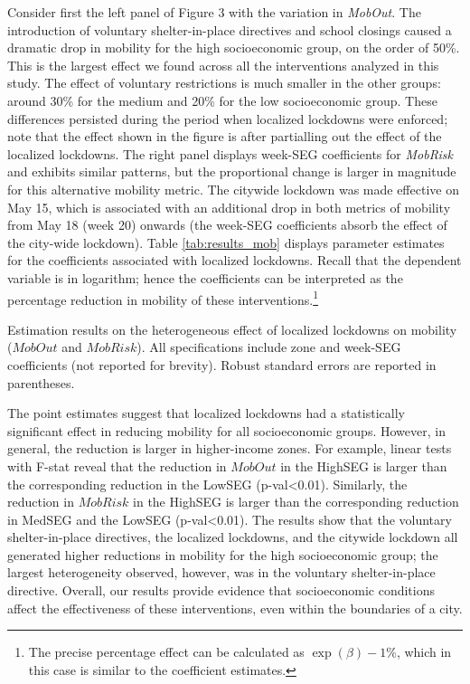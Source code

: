 Consider first the left panel of Figure 3 with the variation in \emph{MobOut}. The introduction of voluntary shelter-in-place directives and school closings caused a dramatic drop in mobility for the high socioeconomic group, on the order of 50\%. This is the largest effect we found across all the interventions analyzed in this study. The effect of voluntary restrictions is much smaller in the other groups: around 30\% for the medium and 20\% for the low socioeconomic group. These differences persisted during the period when localized lockdowns were enforced; note that the effect shown in the figure is after partialling out the effect of the localized lockdowns. The right panel displays week-SEG coefficients for \emph{MobRisk} and exhibits similar patterns, but the proportional change is larger in magnitude for this alternative mobility metric. The citywide lockdown was made effective on May 15, which is associated with an additional drop in both metrics of mobility from May 18 (week 20) onwards (the week-SEG coefficients  absorb the effect of the city-wide lockdown). 
Table \ref{tab:results_mob} displays parameter estimates for the coefficients associated with localized lockdowns. Recall that the dependent variable is in logarithm; hence the coefficients can be interpreted as the percentage reduction in mobility of these interventions.\footnote{The precise percentage effect can be calculated as  $\exp(\beta) - 1\%$, which in this case is similar to the coefficient estimates.}

\begin{table}[htbp] \centering
  \caption{Estimation results on the heterogeneous effect of localized lockdowns on mobility ($MobOut$ and $MobRisk$). All specifications include zone and week-SEG coefficients (not reported for brevity). Robust standard errors are reported in parentheses.}
  \label{tab:results_mob} 
  \footnotesize
    
\end{table}

The point estimates suggest that localized lockdowns had a statistically significant effect in reducing mobility for all socioeconomic groups. However, in general, the reduction is larger in higher-income zones. For example, linear tests with F-stat reveal that the reduction in $MobOut$ in the HighSEG is larger than the corresponding reduction in the LowSEG (p-val<0.01). Similarly, the reduction in $MobRisk$ in the HighSEG is larger than the corresponding reduction in MedSEG and the LowSEG (p-val<0.01). The results show that the voluntary shelter-in-place directives, the localized lockdowns, and the citywide lockdown all generated higher reductions in mobility for the high socioeconomic group; the largest heterogeneity observed, however, was in the voluntary shelter-in-place directive. Overall, our results provide evidence that socioeconomic conditions affect the effectiveness of these interventions, even within the boundaries of a city.


